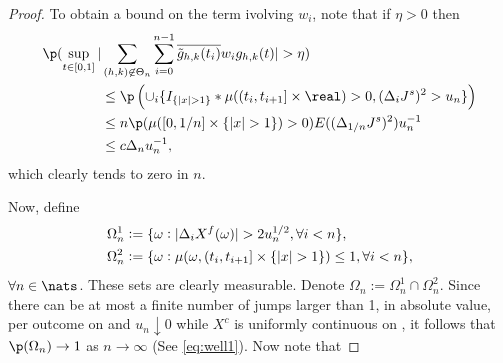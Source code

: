 \begin{proof}
To obtain a bound on the term ivolving $w_i$,  note that if $\eta >  0$ then   
\begin{align} 
  \p( \sup_{t \in \domain}\vert &\sumnt \sumin \btghki w_i \ghk(t)\vert > \eta) \notag \\
  &\le \p\left(\cup_i\{I_{\{\vert x \vert > 1\}}\ast \mu( (t_i, t_{i + 1}] \times \real) > 0   , (\djt)^2 > u_n\}\right) \notag \\ 
  & \le n \p(\mu( [0, 1/n] \times \{\vert x \vert > 1\}) > 0 ) E( (\Delta_{1/n} J^s)^2) u_n^{-1} \notag \\ 
  & \le c \Delta_n u_n^{-1}\notag,
\end{align} 
which clearly tends to zero in $n$.
  \begin{comment}
\p(v_n > \delta /2) & \le 2cKH_n\delta^{-1}E(n^{-1} \log(n) \sumin I_{\{(\djt)^2 > u_n\}}) + \p(\Lambda > K) \notag  \\ & = 2cK H_n\delta^{-1}\log(n) \p( (\Delta_{1/n}J^s)^2 > u_n)  + \varepsilon/2 \notag \\ &\le  2cK H_n\delta^{-1}\log(n) E((\Delta_{1/n} J^s)^2))u_n^{-1}   + \varepsilon/2 \notag \\ &\le 2cKH_n\delta^{-1} \log(n) n^{-1}\kappa u_n^{-1} +  \varepsilon/2\label{eq:asabove} \end{align} where $\kappa := E((\Delta_1 J^s)^2)) < \infty$.  Obviously there is a large enough $n$ such that the first expression above is less than or equal to $\varepsilon/2$.
\end{comment}
\begin{comment} Moreover, because $\delta >  0$,  \begin{align} \p(w_n > \delta/2) & \le \p\left(\cup_i\{I_{\{\vert x \vert > 1\}}\ast \mu( (t_i, t_{i + 1}] \times \real) > 0   , (\djt)^2 > u_n\}\right) \notag \\ & \le n \p(\mu( [0, 1/n] \times \{\vert x \vert > 1\}) > 0 ) E( (\Delta_1 J^s)^2) u_n^{-1} \notag \\ & \le c n^{-1} \kappa u_n^{-1}\notag,\end{align} which clearly tends to zero in $n$. 
\end{comment}
Now, define
\begin{align}
&\Omega_n^1 := \{\omega : \vert \Delta_i X^f(\omega) \vert > 2u^{1/2}_n, \forall  i < n\},\notag \\ 
&\Omega_n^2 := \{\omega : \mu(\omega,  (t_i, t_{i+1}] \times \{\vert x \vert > 1\} ) \le 1, \forall i <n  \},\notag 
\end{align}
$\forall n \in \nats$. These sets are clearly measurable. Denote $\Omega_n   := \Omega_n^1 \cap \Omega_n^2 $. Since there can be at most a finite number of jumps  larger than 1,  in absolute value, per outcome on \domain and  $u_n \downarrow 0$ while $X^c$ is uniformly continuous on \domain, it follows that $ \p(\Omega_n) \to 1$ as $n \to \infty$ (See \eqref{eq:well1}). Now note that 

\end{proof}
